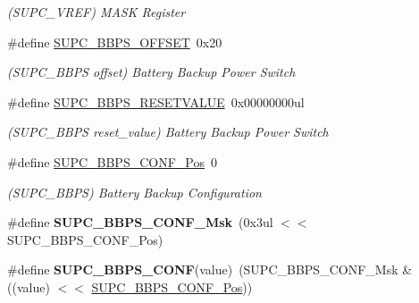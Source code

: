 \begin{DoxyCompactItemize}
\begin{DoxyCompactList}\small\item\em (S\+U\+P\+C\+\_\+\+V\+R\+E\+F) M\+A\+S\+K Register \end{DoxyCompactList}\item 
\hypertarget{group___s_a_m_l21___s_u_p_c_ga03f47f9f7eda052c03200ca320e8d819}{}\#define \hyperlink{group___s_a_m_l21___s_u_p_c_ga03f47f9f7eda052c03200ca320e8d819}{S\+U\+P\+C\+\_\+\+B\+B\+P\+S\+\_\+\+O\+F\+F\+S\+E\+T}~0x20\label{group___s_a_m_l21___s_u_p_c_ga03f47f9f7eda052c03200ca320e8d819}

\begin{DoxyCompactList}\small\item\em (S\+U\+P\+C\+\_\+\+B\+B\+P\+S offset) Battery Backup Power Switch \end{DoxyCompactList}\item 
\hypertarget{group___s_a_m_l21___s_u_p_c_ga71668cb5dfa35c9463a81f539493a38a}{}\#define \hyperlink{group___s_a_m_l21___s_u_p_c_ga71668cb5dfa35c9463a81f539493a38a}{S\+U\+P\+C\+\_\+\+B\+B\+P\+S\+\_\+\+R\+E\+S\+E\+T\+V\+A\+L\+U\+E}~0x00000000ul\label{group___s_a_m_l21___s_u_p_c_ga71668cb5dfa35c9463a81f539493a38a}

\begin{DoxyCompactList}\small\item\em (S\+U\+P\+C\+\_\+\+B\+B\+P\+S reset\+\_\+value) Battery Backup Power Switch \end{DoxyCompactList}\item 
\hypertarget{group___s_a_m_l21___s_u_p_c_gafb7f9d16c3342e20e279e40f0c5a8d06}{}\#define \hyperlink{group___s_a_m_l21___s_u_p_c_gafb7f9d16c3342e20e279e40f0c5a8d06}{S\+U\+P\+C\+\_\+\+B\+B\+P\+S\+\_\+\+C\+O\+N\+F\+\_\+\+Pos}~0\label{group___s_a_m_l21___s_u_p_c_gafb7f9d16c3342e20e279e40f0c5a8d06}

\begin{DoxyCompactList}\small\item\em (S\+U\+P\+C\+\_\+\+B\+B\+P\+S) Battery Backup Configuration \end{DoxyCompactList}\item 
\hypertarget{group___s_a_m_l21___s_u_p_c_ga5b97eb7b41d312654643b2351a42226f}{}\#define {\bfseries S\+U\+P\+C\+\_\+\+B\+B\+P\+S\+\_\+\+C\+O\+N\+F\+\_\+\+Msk}~(0x3ul $<$$<$ S\+U\+P\+C\+\_\+\+B\+B\+P\+S\+\_\+\+C\+O\+N\+F\+\_\+\+Pos)\label{group___s_a_m_l21___s_u_p_c_ga5b97eb7b41d312654643b2351a42226f}

\item 
\hypertarget{group___s_a_m_l21___s_u_p_c_gac23032be13b05d95f9cfa023f9c643f6}{}\#define {\bfseries S\+U\+P\+C\+\_\+\+B\+B\+P\+S\+\_\+\+C\+O\+N\+F}(value)~(S\+U\+P\+C\+\_\+\+B\+B\+P\+S\+\_\+\+C\+O\+N\+F\+\_\+\+Msk \& ((value) $<$$<$ \hyperlink{group___s_a_m_l21___s_u_p_c_gafb7f9d16c3342e20e279e40f0c5a8d06}{S\+U\+P\+C\+\_\+\+B\+B\+P\+S\+\_\+\+C\+O\+N\+F\+\_\+\+Pos}))\label{group___s_a_m_l21___s_u_p_c_gac23032be13b05d95f9cfa023f9c643f6}


\end{DoxyCompactItemize}
